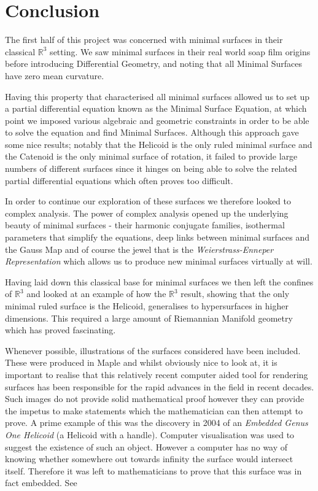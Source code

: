 \section{Conclusion}
The first half of this project was concerned with minimal surfaces in their classical $\mathbb R^3$ setting. We saw minimal surfaces in their real world soap film origins before introducing Differential Geometry, and noting that all Minimal Surfaces have zero mean curvature.

Having this property that characterised all minimal surfaces allowed us to set up a partial differential equation known as the Minimal Surface Equation, at which point we imposed various algebraic and geometric constraints in order to be able to solve the equation and find Minimal Surfaces. Although this approach gave some nice results; notably that the Helicoid is the only ruled minimal surface and the Catenoid is the only minimal surface of rotation, it failed to provide large numbers of different surfaces since it hinges on being able to solve the related partial differential equations which often proves too difficult.

 In order to continue our exploration of these surfaces we therefore looked to complex analysis. The power of complex analysis opened up the underlying beauty of minimal surfaces - their harmonic conjugate families, isothermal parameters that simplify the equations, deep links between minimal surfaces and the Gauss Map and of course the jewel that is the \emph{Weierstrass-Enneper Representation} which allows us to produce new minimal surfaces virtually at will.

Having laid down this classical base for minimal surfaces we then left the confines of $\mathbb R^3$ and looked at an example of how the $\mathbb R^3$ result, showing that the only minimal ruled surface is the Helicoid, generalises to hypersurfaces in higher dimensions. This required a large amount of Riemannian Manifold geometry which has proved fascinating.

Whenever possible, illustrations of the surfaces considered have been included. These were produced in Maple and whilst obviously nice to look at, it is important to realise that this relatively recent computer aided tool for rendering surfaces has been responsible for the rapid advances in the field in recent decades. Such images do not provide solid mathematical proof however they can provide the impetus to make statements which the mathematician can then attempt to prove. A prime example of this was the discovery in 2004 of an \emph{Embedded Genus One Helicoid} (a Helicoid with a handle). Computer visualisation was used to suggest the existence of such an object. However a computer has no way of knowing whether somewhere out towards infinity the surface would intersect itself. Therefore it was left to mathematicians to prove that this surface was in fact embedded. See \cite{HOFF}

